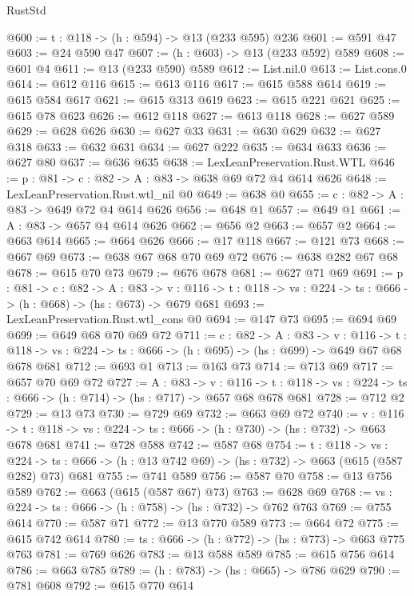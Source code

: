 \begin{lexlean}{RustStd}
\begin{coremodule}
{\begin{coremodule}
{{{{{{{@600 := {t : @118} -> (h : @594) -> @13 (@233 @595) @236
@601 := @591 @47
@603 := @24 @590 @47
@607 := (h : @603) -> @13 (@233 @592) @589
@608 := @601 @4
@611 := @13 (@233 @590) @589
@612 := List.nil.{0}
@613 := List.cons.{0}
@614 := @612 @116
@615 := @613 @116
@617 := @615 @588 @614
@619 := @615 @584 @617
@621 := @615 @313 @619
@623 := @615 @221 @621
@625 := @615 @78 @623
@626 := @612 @118
@627 := @613 @118
@628 := @627 @589
@629 := @628 @626
@630 := @627 @33
@631 := @630 @629
@632 := @627 @318
@633 := @632 @631
@634 := @627 @222
@635 := @634 @633
@636 := @627 @80
@637 := @636 @635
@638 := LexLeanPreservation.Rust.WTL
@646 := {p : @81} -> {c : @82} -> {A : @83} -> @638 @69 @72 @4 @614 @626
@648 := LexLeanPreservation.Rust.wtl_nil @0
@649 := @638 @0
@655 := {c : @82} -> {A : @83} -> @649 @72 @4 @614 @626
@656 := @648 @1
@657 := @649 @1
@661 := {A : @83} -> @657 @4 @614 @626
@662 := @656 @2
@663 := @657 @2
@664 := @663 @614
@665 := @664 @626
@666 := @17 @118
@667 := @121 @73
@668 := @667 @69
@673 := @638 @67 @68 @70 @69 @72
@676 := @638 @282 @67 @68
@678 := @615 @70 @73
@679 := @676 @678
@681 := @627 @71 @69
@691 := {p : @81} ->
  {c : @82} ->
  {A : @83} ->
  {v : @116} -> {t : @118} -> {vs : @224} -> {ts : @666} -> (h : @668) -> (hs : @673) -> @679 @681
@693 := LexLeanPreservation.Rust.wtl_cons @0
@694 := @147 @73
@695 := @694 @69
@699 := @649 @68 @70 @69 @72
@711 := {c : @82} ->
  {A : @83} ->
  {v : @116} ->
  {t : @118} -> {vs : @224} -> {ts : @666} -> (h : @695) -> (hs : @699) -> @649 @67 @68 @678 @681
@712 := @693 @1
@713 := @163 @73
@714 := @713 @69
@717 := @657 @70 @69 @72
@727 := {A : @83} ->
  {v : @116} ->
  {t : @118} -> {vs : @224} -> {ts : @666} -> (h : @714) -> (hs : @717) -> @657 @68 @678 @681
@728 := @712 @2
@729 := @13 @73
@730 := @729 @69
@732 := @663 @69 @72
@740 := {v : @116} ->
  {t : @118} -> {vs : @224} -> {ts : @666} -> (h : @730) -> (hs : @732) -> @663 @678 @681
@741 := @728 @588
@742 := @587 @68
@754 := {t : @118} ->
  {vs : @224} ->
  {ts : @666} -> (h : @13 @742 @69) -> (hs : @732) -> @663 (@615 (@587 @282) @73) @681
@755 := @741 @589
@756 := @587 @70
@758 := @13 @756 @589
@762 := @663 (@615 (@587 @67) @73)
@763 := @628 @69
@768 := {vs : @224} -> {ts : @666} -> (h : @758) -> (hs : @732) -> @762 @763
@769 := @755 @614
@770 := @587 @71
@772 := @13 @770 @589
@773 := @664 @72
@775 := @615 @742 @614
@780 := {ts : @666} -> (h : @772) -> (hs : @773) -> @663 @775 @763
@781 := @769 @626
@783 := @13 @588 @589
@785 := @615 @756 @614
@786 := @663 @785
@789 := (h : @783) -> (hs : @665) -> @786 @629
@790 := @781 @608
@792 := @615 @770 @614
}}}}}}}
\end{coremodule}}
\end{coremodule}
\end{lexlean}
